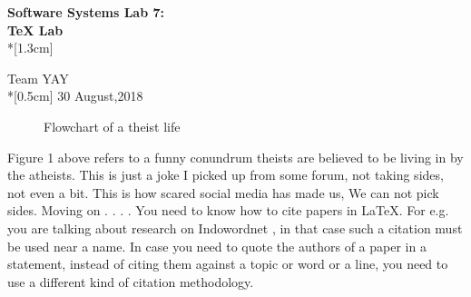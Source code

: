 \documentclass[11pt,a4paper]{article}
\begin{document}
\begin{titlepage}
    \begin{center}
    \vspace*{\fill}
    \begin{LARGE}
    \textbf {Software Systems Lab 7:}
    \\ 
    \textbf{TeX Lab} %
    \\*[1.3cm]
    \end{LARGE}
    \large Team YAY \\*[0.5cm]
    30 August,2018\\
    \vspace*{\fill}
    \end{center}
    \end{titlepage}
\begin{figure}
\centering
{}
 \caption{Flowchart of a theist life}
\end{figure}
Figure 1 above refers to a funny conundrum theists are believed to be
living in by the atheists. This is just a joke I picked up from some forum,
not taking sides, not even a bit. This is how scared social media has made
us, We can not pick sides. Moving on . . . . You need to know how to cite
papers in \LaTeX. For e.g. you are talking about research on Indowordnet \cite{pushpak}, in that case such a citation must be used near a name. In case you
need to quote the authors of a paper in a statement, instead of citing them
against a topic or word or a line, you need to use a different kind of citation
methodology.
\pagebreak
\end{document}
